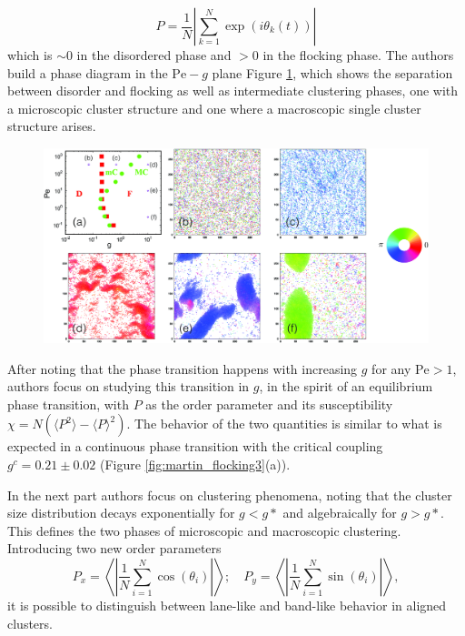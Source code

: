 \documentclass[../../master_thesis_np.tex]{subfiles}
\begin{document}
   	 \begin{equation}
   	 P = \frac{1}{N}\left| \sum_{k=1}^{N} \exp(i \theta_k(t)) \right|
   	 \end{equation}
  	 which is $\sim 0$ in the disordered phase and $> 0$ in the flocking phase. The authors build a phase diagram in the $\mathrm{Pe}-g$ plane Figure \ref{fig:martin_flocking1}, which shows the separation between disorder and flocking as well as intermediate clustering phases, one with a microscopic cluster structure and one where a macroscopic single cluster structure arises.
	
	\begin{figure}[h]
		\centering
		\includegraphics[width=\textwidth]{martin_phaseseparation.png}
		\caption{\parencite{martin-gomez_collective_2018}}
		\label{fig:martin_flocking1}
	\end{figure}
	
	After noting that the phase transition happens with increasing $g$ for any $\mathrm{Pe} > 1$, authors focus on studying this transition in $g$, in the  spirit of an equilibrium phase transition, with $P$ as the order parameter and its susceptibility $\chi = N(\langle P^2 \rangle - \langle P \rangle^2)$. The behavior of the two quantities is similar to what is expected in a continuous phase transition with the critical coupling $g^c = 0.21 \pm 0.02$ (Figure \ref{fig:martin_flocking3}(a)).
	
	In the next part authors focus on clustering phenomena, noting that the cluster size distribution decays exponentially for $g < g*$ and algebraically for $g > g*$. This defines the two phases of microscopic and macroscopic clustering.
	Introducing two new order parameters
	\begin{equation} 
	P_x = \left\langle \left| \frac{1}{N} \sum_{i=1}^N \cos(\theta_i) \right| \right\rangle ; \quad
	P_y = \left\langle \left| \frac{1}{N} \sum_{i=1}^N \sin(\theta_i) \right| \right\rangle,
 	\end{equation}
 	it is possible to distinguish between lane-like and band-like behavior in aligned clusters.
 
\end{document}
